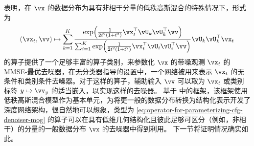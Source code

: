 \documentclass[../../book-main.tex]{subfiles}
\begin{document}
 表明，在 $\vx$ 的数据分布为具有非相干分量的低秩高斯混合的特殊情况下，形式为
\begin{equation}\label{eq:operator-for-parameterizing-cfg-denoiser-mog}
  (\vx_t, \vv) \mapsto
  \sum_{k = 1}^{K}\frac{
    \exp\rp{\frac{1}{2t^{2}(1
    + t^{2})}\vx_t^\top \vU_k \vU_k^\top \vv}
  }
  {
    \sum_{i
    = 1}^{K}\exp\rp{\frac{1}{2t^{2}(1
    + t^{2})}\vx_t^\top \vU_i \vU_i^\top \vv}
  }
  \vU_{k}\vU_{k}^{\top}\vx_t
\end{equation}
的算子提供了一个足够丰富的算子类别，来参数化 $\vx$ 的带噪观测 $\vx_t$ 的 MMSE-最优去噪器，在无分类器指导的设置中，一个网络被用来表示 $\vx_t$ 的无条件和类别条件去噪器。对于这样的算子，辅助输入 $\vv$ 可以取为 $\vx_t$ 或类别标签 $y \mapsto \vv_y$ 的适当嵌入，以实现这样的去噪器。
基于  中的框架，该框架使用低秩高斯混合模型作为基本单元，为将更一般的数据分布转换为结构化表示开发了深度网络架构，很自然地可以想象，类型为 \eqref{eq:operator-for-parameterizing-cfg-denoiser-mog} 的算子可以在具有低维几何结构化且彼此足够可区分（例如，非相干）的分量的一般数据分布 $\vx$ 的去噪器中得到利用。
下一节将证明情况确实如此。
\end{document}

